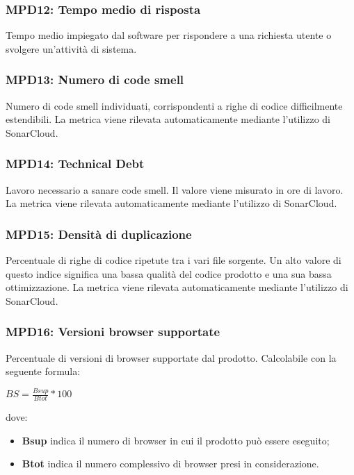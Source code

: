 \subsubsection{MPD12: Tempo medio di risposta}
Tempo medio impiegato dal software per rispondere a una richiesta utente o svolgere un'attività di sistema.

\subsubsection{MPD13: Numero di code smell}
Numero di code smell individuati, corrispondenti a righe di codice difficilmente estendibili.
La metrica viene rilevata automaticamente mediante l’utilizzo di {SonarCloud}\glo.

\subsubsection{MPD14: Technical Debt}
Lavoro necessario a sanare code smell. Il valore viene misurato in ore di lavoro.
La metrica viene rilevata automaticamente mediante l’utilizzo di {SonarCloud}\glo.

\subsubsection{MPD15: Densità di duplicazione}
Percentuale di righe di codice ripetute tra i vari file sorgente.
Un alto valore di questo indice significa una bassa qualità del codice prodotto e una sua bassa ottimizzazione.
La metrica viene rilevata automaticamente mediante l’utilizzo di {SonarCloud}\glo.

\subsubsection{MPD16: Versioni browser supportate}
Percentuale di versioni di browser supportate dal prodotto.
Calcolabile con la seguente formula:
\begin{center}
    $BS = \displaystyle \frac{Bsup}{Btot}*100$
\end{center}
dove:
\begin{itemize}
    \item \textbf{Bsup} indica il numero di browser in cui il prodotto può essere eseguito;
    \item \textbf{Btot} indica il numero complessivo di browser presi in considerazione.
\end{itemize}

